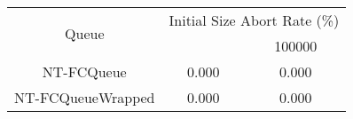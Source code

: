 \begin{tabular}{|c|c|c|}
\hline
\multirow{2}{*}{Queue} & \multicolumn{2}{c|}{Initial Size Abort Rate (\%)}\\\cline{2-3}& \quad 10000 \quad & 100000\\
\hline
\hline
NT-FCQueue & 0.000 & 0.000\\
NT-FCQueueWrapped & 0.000 & 0.000\\
\hline\end{tabular}
